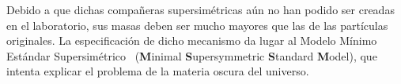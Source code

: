 Debido a que dichas compañeras supersimétricas aún no han podido ser creadas en el laboratorio, sus masas deben ser mucho mayores que las de las partículas originales. %
La especificación de dicho mecanismo da lugar al Modelo Mínimo Estándar Supersimétrico \MSSM~(\textbf{M}inimal \textbf{S}upersymmetric \textbf{S}tandard \textbf{M}odel), que intenta explicar el problema de la materia oscura del universo.





 